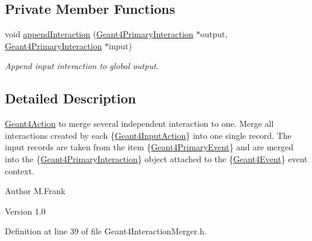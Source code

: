 \subsection*{Private Member Functions}
\begin{DoxyCompactItemize}
\item 
void \hyperlink{class_d_d4hep_1_1_simulation_1_1_geant4_interaction_merger_a224d85d05dcd541ef4185e0a91ade714}{appendInteraction} (\hyperlink{class_d_d4hep_1_1_simulation_1_1_geant4_primary_interaction}{Geant4PrimaryInteraction} $\ast$output, \hyperlink{class_d_d4hep_1_1_simulation_1_1_geant4_primary_interaction}{Geant4PrimaryInteraction} $\ast$input)
\begin{DoxyCompactList}\small\item\em Append input interaction to global output. \item\end{DoxyCompactList}\end{DoxyCompactItemize}


\subsection{Detailed Description}
\hyperlink{class_d_d4hep_1_1_simulation_1_1_geant4_action}{Geant4Action} to merge several independent interaction to one. Merge all interactions created by each \{\hyperlink{class_d_d4hep_1_1_simulation_1_1_geant4_input_action}{Geant4InputAction}\} into one single record. The input records are taken from the item \{\hyperlink{class_d_d4hep_1_1_simulation_1_1_geant4_primary_event}{Geant4PrimaryEvent}\} and are merged into the \{\hyperlink{class_d_d4hep_1_1_simulation_1_1_geant4_primary_interaction}{Geant4PrimaryInteraction}\} object attached to the \{\hyperlink{class_d_d4hep_1_1_simulation_1_1_geant4_event}{Geant4Event}\} event context.

\begin{DoxyAuthor}{Author}
M.Frank 
\end{DoxyAuthor}
\begin{DoxyVersion}{Version}
1.0 
\end{DoxyVersion}


Definition at line 39 of file Geant4InteractionMerger.h.

